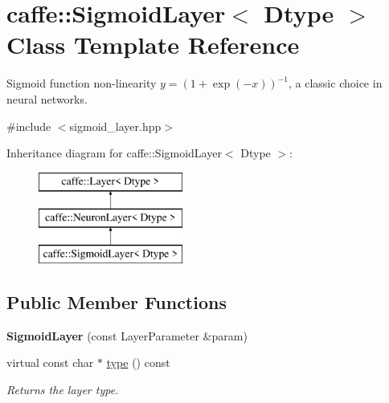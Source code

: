 \hypertarget{classcaffe_1_1SigmoidLayer}{}\section{caffe\+:\+:Sigmoid\+Layer$<$ Dtype $>$ Class Template Reference}
\label{classcaffe_1_1SigmoidLayer}


Sigmoid function non-\/linearity $ y = (1 + \exp(-x))^{-1} $, a classic choice in neural networks.  




{\ttfamily \#include $<$sigmoid\+\_\+layer.\+hpp$>$}

Inheritance diagram for caffe\+:\+:Sigmoid\+Layer$<$ Dtype $>$\+:\begin{figure}[H]
\begin{center}
\leavevmode
\includegraphics[height=3.000000cm]{classcaffe_1_1SigmoidLayer}
\end{center}
\end{figure}
\subsection*{Public Member Functions}
\begin{DoxyCompactItemize}
\item 
{\bfseries Sigmoid\+Layer} (const Layer\+Parameter \&param)\hypertarget{classcaffe_1_1SigmoidLayer_a590e2978bafd7722535e64c0326c59ce}{}\label{classcaffe_1_1SigmoidLayer_a590e2978bafd7722535e64c0326c59ce}

\item 
virtual const char $\ast$ \hyperlink{classcaffe_1_1SigmoidLayer_a3d9b66404ad6d8b65bb0bba662cb1189}{type} () const \hypertarget{classcaffe_1_1SigmoidLayer_a3d9b66404ad6d8b65bb0bba662cb1189}{}\label{classcaffe_1_1SigmoidLayer_a3d9b66404ad6d8b65bb0bba662cb1189}

\begin{DoxyCompactList}\small\item\em Returns the layer type. \end{DoxyCompactList}\end{DoxyCompactItemize}
